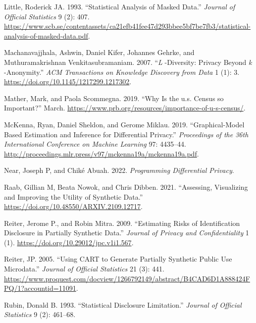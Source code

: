 \documentclass[
]{urban-formatting}
\newlength{\cslhangindent}
\newlength{\cslentryspacingunit} %
\newenvironment{CSLReferences}[2] %
 {%
  \setlength{\parindent}{0pt}
  \ifodd #1
  \let\oldpar\par
  \def\par{\hangindent=\cslhangindent\oldpar}
  \fi
  \setlength{\parskip}{#2\cslentryspacingunit}
 }%
 {}
\begin{document}
\begin{CSLReferences}{1}{0}
\leavevmode{}%
Little, Roderick JA. 1993. {``Statistical Analysis of Masked Data.''}
\emph{Journal of Official Statistics} 9 (2): 407.
\url{https://www.scb.se/contentassets/ca21efb41fee47d293bbee5bf7be7fb3/statistical-analysis-of-masked-data.pdf}.

\leavevmode{}%
Machanavajjhala, Ashwin, Daniel Kifer, Johannes Gehrke, and
Muthuramakrishnan Venkitasubramaniam. 2007. {``{\emph{L}} -Diversity:
Privacy Beyond {\emph{k}} -Anonymity.''} \emph{ACM Transactions on
Knowledge Discovery from Data} 1 (1): 3.
\url{https://doi.org/10.1145/1217299.1217302}.

\leavevmode{}%
Mather, Mark, and Paola Scommegna. 2019. {``Why Is the u.s. Census so
Important?''} March.
\url{https://www.prb.org/resources/importance-of-u-s-census/}.

\leavevmode{}%
McKenna, Ryan, Daniel Sheldon, and Gerome Miklau. 2019.
{``Graphical-Model Based Estimation and Inference for Differential
Privacy.''} \emph{Proceedings of the 36th International Conference on
Machine Learning} 97: 4435--44.
\url{http://proceedings.mlr.press/v97/mckenna19a/mckenna19a.pdf}.

\leavevmode{}%
Near, Joseph P, and Chiké Abuah. 2022. \emph{Programming Differential
Privacy}.

\leavevmode{}%
Raab, Gillian M, Beata Nowok, and Chris Dibben. 2021. {``Assessing,
Visualizing and Improving the Utility of Synthetic Data.''}
\url{https://doi.org/10.48550/ARXIV.2109.12717}.

\leavevmode{}%
Reiter, Jerome P., and Robin Mitra. 2009. {``Estimating Risks of
Identification Disclosure in Partially Synthetic Data.''} \emph{Journal
of Privacy and Confidentiality} 1 (1).
\url{https://doi.org/10.29012/jpc.v1i1.567}.

\leavevmode{}%
Reiter, JP. 2005. {``Using CART to Generate Partially Synthetic Public
Use Microdata.''} \emph{Journal of Official Statistics} 21 (3): 441.
\url{https://www.proquest.com/docview/1266792149/abstract/B4CAD6D1A888424FPQ/1?accountid=11091}.

\leavevmode{}%
Rubin, Donald B. 1993. {``Statistical Disclosure Limitation.''}
\emph{Journal of Official Statistics} 9 (2): 461--68.


\end{CSLReferences}
\end{document}
